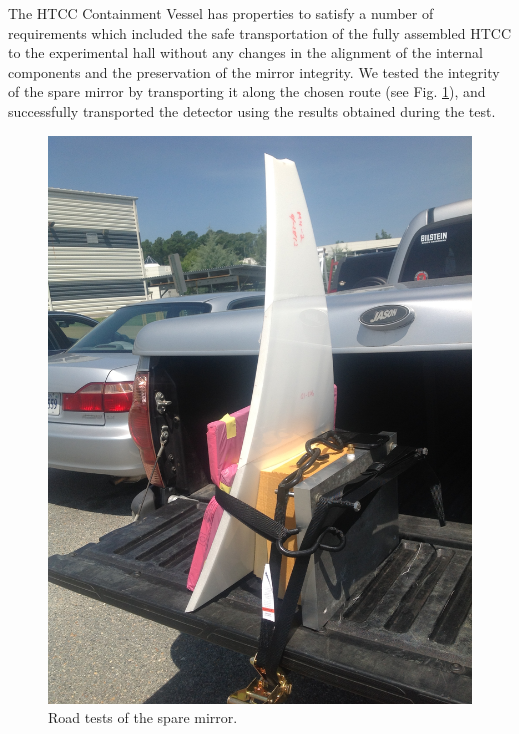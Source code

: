 The HTCC Containment Vessel has properties to satisfy a number of requirements which included the safe transportation of the fully assembled HTCC to the experimental hall without any changes in the alignment of the internal components and the preservation of the mirror integrity. We tested the integrity of the spare mirror by transporting it along the chosen route (see Fig. \ref{fig:transportation_spare_mirror}), and successfully transported the detector using the results obtained during the test. 

\begin{figure}[ht]
    \centering
    \includegraphics[trim={1.5cm 5cm 0 2cm }, clip, width=\linewidth]{images/Road_Test.JPG}
    \caption{Road tests of the spare mirror.}
    \label{fig:transportation_spare_mirror}
\end{figure}

  
